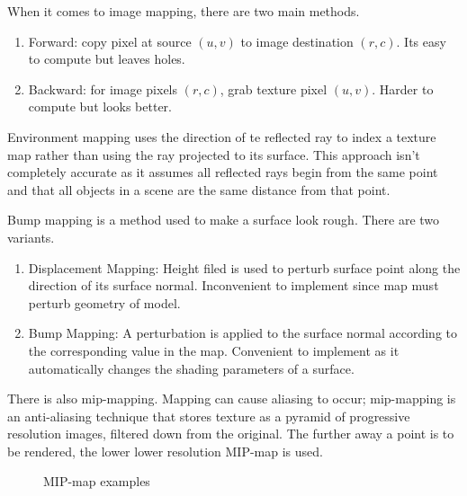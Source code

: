 When it comes to image mapping, there are two main methods.
\begin{enumerate}
	\item Forward: copy pixel at source $(u,v)$ to image destination $(r, c)$. Its easy to compute but leaves holes.
	\item Backward: for image pixels $(r,c)$, grab texture pixel $(u,v)$. Harder to compute but looks better.
\end{enumerate}
Environment mapping uses the direction of te reflected ray to index a texture map rather than using the ray projected to its surface. This approach isn't completely accurate as it assumes all reflected rays begin from the same point and that all objects in a scene are the same distance from that point.

Bump mapping is a method used to make a surface look rough. There are two variants.
\begin{enumerate}
	\item Displacement Mapping: Height filed is used to perturb surface point along the direction of its surface normal. Inconvenient to implement since map must perturb geometry of model.
	\item Bump Mapping: A perturbation is applied to the surface normal according to the corresponding value in the map. Convenient to implement as it automatically changes the shading parameters of a surface.
\end{enumerate}

There is also mip-mapping. Mapping can cause aliasing to occur; mip-mapping is an anti-aliasing technique that stores texture as a pyramid of progressive resolution images, filtered down from the original. The further away a point is to be rendered, the lower lower resolution MIP-map is used.
\begin{figure}[!htb]
	\caption{\label{fig:imageMap} MIP-map examples}
\end{figure}
